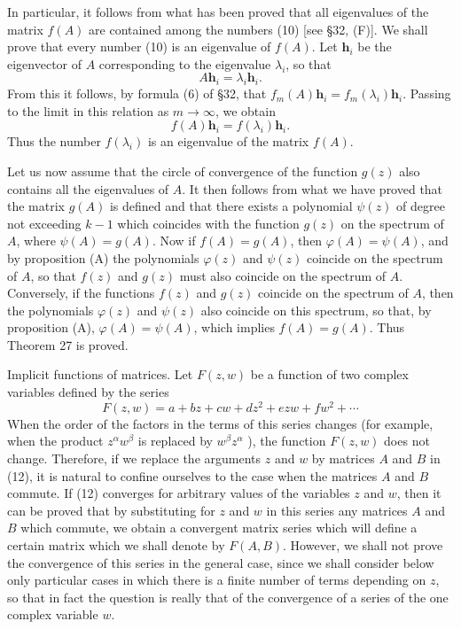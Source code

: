 \documentclass[10pt,a5paper]{book}
\makeatletter
\theoremstyle{plain}
\theoremstyle{definition}
\theoremstyle{remark}
\renewenvironment{proof}[1][\proofname]{\par
  \pushQED{\qed}%
  \normalfont\topsep6\p@\@plus6\p@\relax
  \trivlist
  \item\relax{\itshape #1\@addpunct{.}}\hspace\labelsep\ignorespaces
}{\popQED\endtrivlist\@endpefalse}
\makeatother
\begin{document}
\begin{proof}
In particular, it follows from what has been proved that all eigenvalues of the matrix $f(A)$ are contained among the numbers (10) [see §32, (F)]. We shall prove that every number (10) is an eigenvalue of $f(A)$. Let $\mathbf{h}_{i}$ be the eigenvector of $A$ corresponding to the eigenvalue $\lambda_{i}$, so that
\[
A \mathbf{h}_{i}=\lambda_{i} \mathbf{h}_{i} .
\]
From this it follows, by formula (6) of §32, that $f_{m}(A) \mathbf{h}_{i}=f_{m}\left(\lambda_{i}\right) \mathbf{h}_{i}$. Passing to the limit in this relation as $m \rightarrow \infty$, we obtain
\[
f(A) \mathbf{h}_{i}=f\left(\lambda_{i}\right) \mathbf{h}_{i} .
\]
Thus the number $f\left(\lambda_{i}\right)$ is an eigenvalue of the matrix $f(A)$.

Let us now assume that the circle of convergence of the function $g(z)$ also contains all the eigenvalues of $A$. It then follows from what we have proved that the matrix $g(A)$ is defined and that there exists a polynomial $\psi(z)$ of degree not exceeding $k-1$ which coincides with the function $g(z)$ on the spectrum of $A$, where $\psi(A)=g(A)$. Now if $f(A)=g(A)$, then $\varphi(A)=\psi(A)$, and by proposition (A) the polynomials $\varphi(z)$ and $\psi(z)$ coincide on the spectrum of $A$, so that $f(z)$ and $g(z)$ must also coincide on the spectrum of $A$. Conversely, if the functions $f(z)$ and $g(z)$ coincide
on the spectrum of $A$, then the polynomials $\varphi(z)$ and $\psi(z)$ also coincide on this spectrum, so that, by proposition (A), $\varphi(A)=\psi(A)$, which implies $f(A)=g(A)$. Thus Theorem 27 is proved.

Implicit functions of matrices. Let $F(z, w)$ be a function of two complex variables defined by the series
\begin{equation*}
F(z, w)=a+b z+c w+d z^{2}+e z w+f w^{2}+\cdots \tag{12}
\end{equation*}
When the order of the factors in the terms of this series changes (for example, when the product $z^{\alpha} w^{\beta}$ is replaced by $w^{\beta} z^{\alpha}$ ), the function $F(z, w)$ does not change. Therefore, if we replace the arguments $z$ and $w$ by matrices $A$ and $B$ in (12), it is natural to confine ourselves to the case when the matrices $A$ and $B$ commute. If (12) converges for arbitrary values of the variables $z$ and $w$, then it can be proved that by substituting for $z$ and $w$ in this series any matrices $A$ and $B$ which commute, we obtain a convergent matrix series which will define a certain matrix which we shall denote by $F(A, B)$. However, we shall not prove the convergence of this series in the general case, since we shall consider below only particular cases in which there is a finite number of terms depending on $z$, so that in fact the question is really that of the convergence of a series of the one complex variable $w$.


\end{proof}
\end{document}
